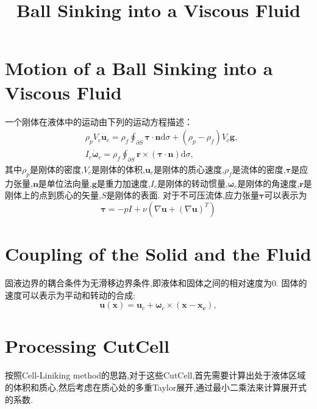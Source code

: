 \documentclass[12pt,halfline,a4paper]{ouparticle}
\begin{document}
\title{Ball Sinking into a Viscous Fluid} 

\author{%
}
\date{}

\maketitle
\tableofcontents
\newpage

\section{Motion of a Ball Sinking into a Viscous Fluid}
一个刚体在液体中的运动由下列的运动方程描述：
\begin{equation}\begin{aligned}
    & \rho_{p}V_{c}\dot{\boldsymbol{u}}_{c}=\rho_{f}\oint_{\partial S}\boldsymbol{\tau}\cdot\boldsymbol{n}\mathrm{d}\sigma+(\rho_{p}-\rho_{f})V_{c}\boldsymbol{g}, \\
    & I_{c}\dot{\boldsymbol{\omega}}_{c}=\rho_{f}\oint_{\partial S}\boldsymbol{r}\times(\boldsymbol{\tau}\cdot\boldsymbol{n})\mathrm{d}\sigma,
   \end{aligned}\end{equation}
其中$\rho_{p}$是刚体的密度,$V_{c}$是刚体的体积,$\boldsymbol{u}_{c}$是刚体的质心速度,$\rho_{f}$是流体的密度,$\boldsymbol{\tau}$是应力张量,$\boldsymbol{n}$是单位法向量,$\boldsymbol{g}$是重力加速度,$I_{c}$是刚体的转动惯量,$\boldsymbol{\omega}_{c}$是刚体的角速度,$\boldsymbol{r}$是刚体上的点到质心的矢量,$S$是刚体的表面.
对于不可压流体,应力张量$\boldsymbol{\tau}$可以表示为
$$\boldsymbol \tau = -pI + \nu (\nabla \boldsymbol{u} + (\nabla \boldsymbol{u})^T)$$

\section{Coupling of the Solid and the Fluid}
固液边界的耦合条件为无滑移边界条件,即液体和固体之间的相对速度为0.
固体的速度可以表示为平动和转动的合成:
\begin{equation}\boldsymbol u(\boldsymbol{x})=\boldsymbol{u}_c+\boldsymbol{\omega}_c\times(\boldsymbol{x}-\boldsymbol{x_c}),\end{equation}

\section{Processing CutCell}
按照Cell-Liniking method\cite{celllinking,stateredistribution}的思路,对于这些CutCell,首先需要计算出处于液体区域的体积和质心,然后考虑在质心处的多重Taylor展开,通过最小二乘法来计算展开式的系数\cite{fourthorder}.
\end{document}
